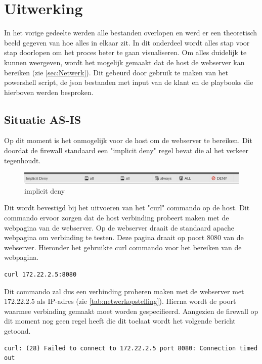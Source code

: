 \section{Uitwerking}
In het vorige gedeelte werden alle bestanden overlopen en werd er een theoretisch beeld gegeven van hoe alles in elkaar zit. In dit onderdeel wordt alles stap voor stap doorlopen om het proces beter te gaan visualiseren. Om alles duidelijk te kunnen weergeven, wordt het mogelijk gemaakt dat de host de webserver kan bereiken (zie \ref{sec:Netwerk}). Dit gebeurd door gebruik te maken van het powershell script, de json bestanden met input van de klant en de playbooks die hierboven werden besproken. 

\subsection{Situatie AS-IS}
Op dit moment is het onmogelijk voor de host om de webserver te bereiken. 
Dit doordat de firewall standaard een "implicit deny" regel bevat die al het verkeer tegenhoudt. 

\begin{figure}[h]
    \centering
    \includegraphics[width=158mm]{bachproef/graphics/implicit deny.png}
    \caption{implicit deny}
    \label{fig:deny}
\end{figure}

Dit wordt bevestigd bij het uitvoeren van het "curl" commando op de host. Dit commando ervoor zorgen dat de host verbinding probeert maken met de webpagina van de webserver. Op de webserver draait de standaard apache webpagina om verbinding te testen. Deze pagina draait op poort 8080 van de webserver. Hieronder het gebruikte curl commando voor het bereiken van de webpagina. 

\begin{lstlisting}[caption={test verbinding met webpagina}]
    curl 172.22.2.5:8080
\end{lstlisting}

Dit commando zal dus een verbinding proberen maken met de webserver met 172.22.2.5 als IP-adres (zie \ref{tab:netwerkopstelling}). Hierna wordt de poort waarmee verbinding gemaakt moet worden gespecifieerd. Aangezien de firewall op dit moment nog geen regel heeft die dit toelaat wordt het volgende bericht getoond. 

\begin{lstlisting}[caption={foutmelding curl}]
    curl: (28) Failed to connect to 172.22.2.5 port 8080: Connection timed out
\end{lstlisting}

